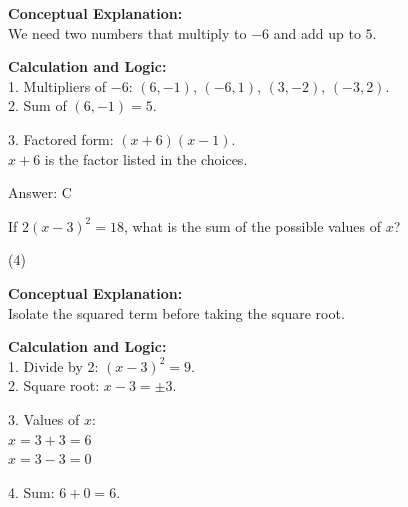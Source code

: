 \documentclass[11pt,paper=a4,answers]{exam}
\begin{document}
\begin{questions}
\begin{solution}
\textbf{Conceptual Explanation:} \\
We need two numbers that multiply to $-6$ and add up to $5$.

\vspace{15pt}

\textbf{Calculation and Logic:} \\
1. Multipliers of $-6$: $(6, -1)$, $(-6, 1)$, $(3, -2)$, $(-3, 2)$. \\
2. Sum of $(6, -1) = 5$.

\vspace{10pt}

3. Factored form: $(x + 6)(x - 1)$. \\
   $x + 6$ is the factor listed in the choices.

\vspace{20pt}

Answer: \colorbox{yellow!100}{C}
\end{solution}

\vspace{30pt}

\question
If $2(x - 3)^2 = 18$, what is the sum of the possible values of $x$?
\begin{tasks}(4)
\end{tasks}

\begin{solution}
\textbf{Conceptual Explanation:} \\
Isolate the squared term before taking the square root.

\vspace{15pt}

\textbf{Calculation and Logic:} \\
1. Divide by 2: $(x - 3)^2 = 9$. \\
2. Square root: $x - 3 = \pm 3$.

\vspace{10pt}

3. Values of $x$: \\
   $x = 3 + 3 = 6$ \\
   $x = 3 - 3 = 0$

\vspace{10pt}

4. Sum: $6 + 0 = 6$.

\vspace{20pt}


\end{solution}
\end{questions}
\end{document}
